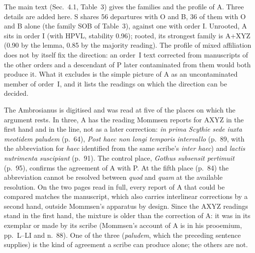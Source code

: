 \documentclass[11pt,a4paper]{article}
\theoremstyle{remark}
\begin{document}
The main text (Sec.~4.1, Table~3) gives the families and the profile of A. Three details are added here. S shares 56 departures with O and B, 36 of them with O and B alone (the family SOB of Table~3), against one with order I. Unrooted, A sits in order I (with HPVL, stability 0.96); rooted, its strongest family is A+XYZ (0.90 by the lemma, 0.85 by the majority reading). The profile of mixed affiliation does not by itself fix the direction: an order~I text corrected from manuscripts of the other orders and a descendant of P later contaminated from them would both produce it. What it excludes is the simple picture of A as an uncontaminated member of order~I, and it lists the readings on which the direction can be decided.

The Ambrosianus is digitised and was read at five of the places on which the argument rests. In three, A has the reading Mommsen reports for AXYZ in the first hand and in the line, not as a later correction: \emph{in prima Scythie sede iuxta meotidem paludem} (p.~64), \emph{Post haec non longi temporis intervallo} (p.~89, with the abbreviation for \emph{haec} identified from the same scribe's \emph{inter haec}) and \emph{lactis nutrimenta suscipiant} (p.~91). The control place, \emph{Gothus subsensit pertimuit} (p.~95), confirms the agreement of A with P. At the fifth place (p.~84) the abbreviation cannot be resolved between \emph{quod} and \emph{quam} at the available resolution. On the two pages read in full, every report of A that could be compared matches the manuscript, which also carries interlinear corrections by a second hand, outside Mommsen's apparatus by design. Since the AXYZ readings stand in the first hand, the mixture is older than the correction of A: it was in its exemplar or made by its scribe (Mommsen's account of A is in his prooemium, pp.~L--LI and n.~88). One of the three (\emph{paludem}, which the preceding sentence supplies) is the kind of agreement a scribe can produce alone; the others are not.
\end{document}
